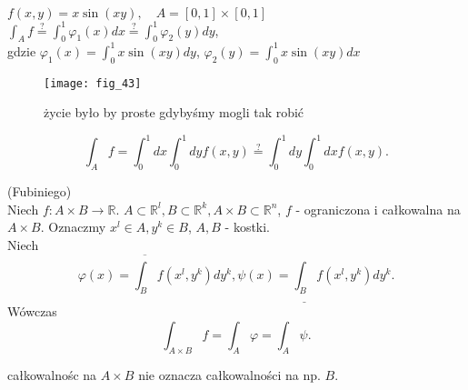 \documentclass[../main.tex]{subfiles}
\begin{document}
    \begin{przyklad}
        $f(x,y) = x \sin(xy), \quad A=[0,1]\times[0,1]$\\
        $\int_A f \overset{\text{?}}{=} \int_{0}^{1} \varphi_1(x)dx \overset{\text{?}}{=} \int_0^1 \varphi_2(y)dy$,\\
        gdzie $\varphi_1(x) = \int_0^1 x\sin(xy)dy$, $\varphi_2(y) = \int_0^1 x\sin(xy)dx$
        \begin{figure}[h]
            \centering
            \texttt{[image: fig\_43]}
            \caption{życie było by proste gdybyśmy mogli tak robić}
        \end{figure}
        \[
            \int_{A}f = \int_0^1 dx \int_0^1 dy f(x,y) \overset{\text{?}}{=} \int_0^1dy \int_0^1dx f(x,y)
        .\]
    \end{przyklad}
    \begin{tw}
        (Fubiniego)\\
        Niech $f: A\times B\to \mathbb{R}$. $A\subset\mathbb{R}^l, B\subset\mathbb{R}^k, A\times B\subset\mathbb{R}^n$, $f$ - ograniczona i całkowalna na $A\times B$. Oznaczmy $x^l\in A, y^k\in B$, $A,B$ - kostki.\\
        Niech \[
            \varphi(x) = \overline{\int_B}f(x^l,y^k)dy^k, \psi(x) = \underline{\int_B} f(x^l, y^k)dy^k
        .\]
        Wówczas \[
        \int_{A\times B} f = \int_A \varphi = \int_A \psi
        .\]
        \begin{uwaga}
            całkowalnośc na $A\times B$ nie oznacza całkowalności na np. $B$.
        \end{uwaga}
    \end{tw}
\end{document}
